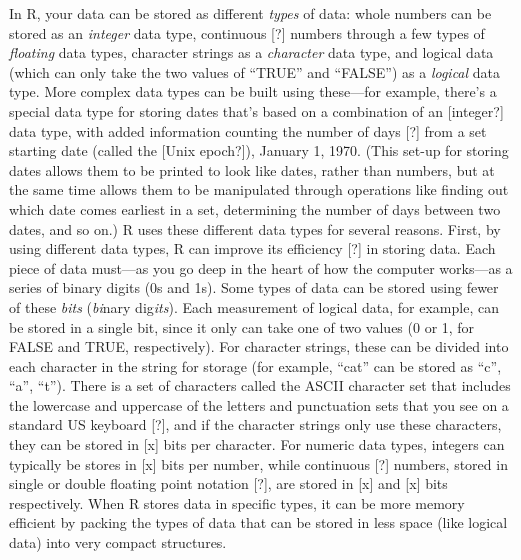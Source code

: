 \documentclass[]{tufte-book}
\begin{document}
In R, your data can be stored as different \emph{types} of data: whole numbers can be
stored as an \emph{integer} data type, continuous {[}?{]} numbers through a few types of
\emph{floating} data types, character strings as a \emph{character} data type, and logical
data (which can only take the two values of ``TRUE'' and ``FALSE'') as a \emph{logical}
data type. More complex data types can be built using these---for example,
there's a special data type for storing dates that's based on a combination of
an {[}integer?{]} data type, with added information counting the number of days {[}?{]}
from a set starting date (called the {[}Unix epoch?{]}), January 1, 1970. (This
set-up for storing dates allows them to be printed to look like dates, rather
than numbers, but at the same time allows them to be manipulated through
operations like finding out which date comes earliest in a set, determining the
number of days between two dates, and so on.) R uses these different data types
for several reasons. First, by using different data types, R can improve its
efficiency {[}?{]} in storing data. Each piece of data must---as you go deep in the
heart of how the computer works---as a series of binary digits (0s and 1s).
Some types of data can be stored using fewer of these \emph{bits} (\emph{bi}nary dig\emph{its}).
Each measurement of logical data, for example, can be stored in a single bit,
since it only can take one of two values (0 or 1, for FALSE and TRUE, respectively).
For character strings, these can be divided into each character in the string
for storage (for example, ``cat'' can be stored as ``c'', ``a'', ``t''). There is a set
of characters called the ASCII character set that includes the lowercase and
uppercase of the letters and punctuation sets that you see on a standard
US keyboard {[}?{]}, and if the character strings only use these characters, they
can be stored in {[}x{]} bits per character. For numeric data types, integers can
typically be stores in {[}x{]} bits per number, while continuous {[}?{]} numbers,
stored in single or double floating point notation {[}?{]}, are stored in {[}x{]}
and {[}x{]} bits respectively. When R stores data in specific types, it can be
more memory efficient by packing the types of data that can be stored in less
space (like logical data) into very compact structures.
\end{document}
